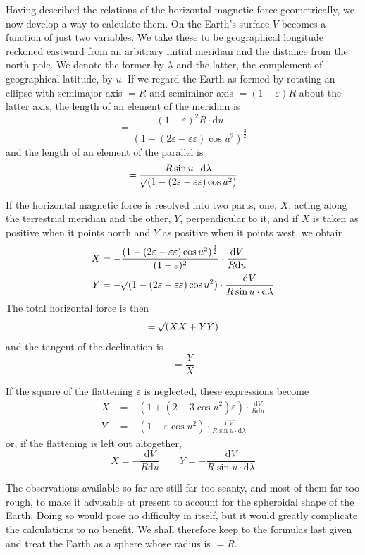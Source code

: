 Having described the relations of the horizontal magnetic force geometrically, we now develop a way to calculate them. On the Earth's surface $V$ becomes a function of just two variables. We take these to be geographical longitude reckoned eastward from an arbitrary initial meridian and the distance from the north pole. We denote the former by $\lambda$ and the latter, the complement of geographical latitude, by $u$. If we regard the Earth as formed by rotating an ellipse with semimajor axis $=R$ and semiminor axis $=(1-\varepsilon)R$ about the latter axis, the length of an element of the meridian is
\[
=\frac{(1-\varepsilon)^2R\cdot\mathrm{d}u}{(1-(2\varepsilon-\varepsilon\varepsilon)\cos u^2)^{\frac32}}
\]
and the length of an element of the parallel is
\[
=\frac{R\sin u\cdot\mathrm{d}\lambda}{\mathord{{}^{}\!\surd}(1-(2\varepsilon-\varepsilon\varepsilon)\cos u^2)}
\]

If the horizontal magnetic force is resolved into two parts, one, $X$, acting along the terrestrial meridian and the other, $Y$, perpendicular to it, and if $X$ is taken as positive when it points north and $Y$ as positive when it points west, we obtain
\[
\begin{aligned}
X&=-\frac{(1-(2\varepsilon-\varepsilon\varepsilon)\cos u^2)^{\frac32}}{(1-\varepsilon)^2}\cdot\frac{\mathrm{d}V}{R\mathrm{d}u}\\
Y&=-\mathord{{}^{}\!\surd}(1-(2\varepsilon-\varepsilon\varepsilon)\cos u^2)\cdot\frac{\mathrm{d}V}{R\sin u\cdot\mathrm{d}\lambda}
\end{aligned}
\]
The total horizontal force is then
\[
=\mathord{{}^{}\!\surd}(XX+YY)
\]
and the tangent of the declination is
\[
=\frac YX
\]

If the square of the flattening $\varepsilon$ is neglected, these expressions become
\[
\begin{aligned}
X&=-(1+(2-3\cos u^2)\varepsilon)\cdot\frac{\mathrm{d}V}{R\mathrm{d}u}\\
Y&=-(1-\varepsilon\cos u^2)\cdot\frac{\mathrm{d}V}{R\sin u\cdot\mathrm{d}\lambda}
\end{aligned}
\]
or, if the flattening is left out altogether,
\[
X=-\frac{\mathrm{d}V}{R\mathrm{d}u}\qquad Y=-\frac{\mathrm{d}V}{R\sin u\cdot\mathrm{d}\lambda}
\]

The observations available so far are still far too scanty, and most of them far too rough, to make it advisable at present to account for the spheroidal shape of the Earth. Doing so would pose no difficulty in itself, but it would greatly complicate the calculations to no benefit. We shall therefore keep to the formulas last given and treat the Earth as a sphere whose radius is $=R$.

